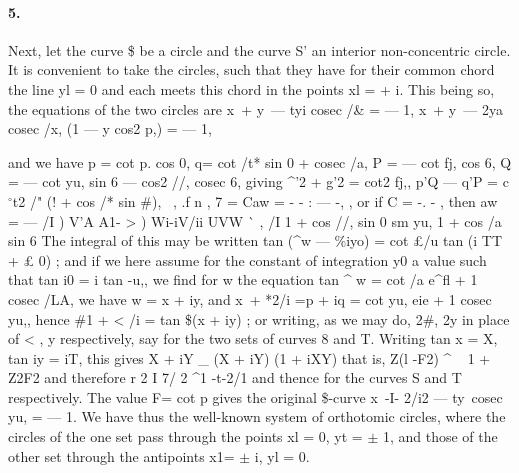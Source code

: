 \documentclass[11pt,a4paper]{book}
\begin{document}
{{{{{{\paragraph{5.} Next,  let  the  curve  \$  be  a  circle  and  the  curve  S'  an  interior  non-concentric
circle.  It  is  convenient  to  take  the  circles,  such  that  they  have  for  their  common
chord  the  line  yl  =  0  and  each  meets  this  chord  in  the  points  xl  =  +  i.
This  being  so,  the  equations  of  the  two  circles  are
x\  +  y\  ---  tyi  cosec  /\&  =  ---  1,
x\  +  y\  ---  2ya  cosec  /x,  (1  ---  y  cos2  p,)  =  ---  1,


and  we  have
p  =      cot  p.  cos  0,      q=     cot  /t*  sin  0  +  cosec  /a,
P  =  ---  cot  fj,  cos  6,     Q  =  ---  cot  yu,  sin  6  ---  cos2  //,  cosec  6,
giving
^'2  +  g'2  =  cot2  fj,,
p'Q  ---  q'P  =  c$^\circ$t2  /" (!  +  cos  /*  sin  \#),
~,  .f  n  ,
7  =  Caw  =  -  -  :  ---  -,  ,  or  if   C  =  -.  -  ,  then  aw  =
---     /I    )       V'A        A1-         >      )        Wi-iV/ii        UVW     ^^       ,     /I    
1  +  cos  //,  sin  0  sm  yu,  1  +  cos  /a  sin  6
The  integral  of  this  may  be  written
tan  (^w  ---  \%iyo)  =  cot  £/u  tan  (i  TT  +  £  0)  ;
and  if  we  here  assume  for  the  constant  of  integration  y0  a  value  such  that
tan    i0  =  i  tan  -u,,
we  find  for  w  the  equation
tan  ^  w  =  cot  /a  e^fl  +  1  cosec  /LA,
we  have  w  =  x  +  iy,  and
x\  +  *2/i  =p  +  iq  =  cot  yu,  eie  +  1  cosec  yu,,
hence
\#1  +  < /i  =  tan  \$(x  +  iy)  ;
or  writing,  as  we  may  do,  2\#,  2y  in  place  of  < ,  y  respectively,  say
for  the  two  sets  of  curves  8  and  T.
Writing  tan  x  =  X,  tan  iy  =  iT,  this  gives
X  +  iY  \_  (X  +  iY)  (1  +  iXY)
that  is,
Z(l  -F2)
^  ~  1  +  Z2F2
and  therefore
r  2    I    7/  2
^1     -t-2/1
and  thence
for  the  curves  S  and  T  respectively.     The  value  F=  cot  p  gives  the  original  \$-curve
x\  -I-  2/i2  ---  ty\  cosec  yu,  =  ---  1.
We  have  thus  the  well-known  system  of  orthotomic  circles,  where  the  circles  of  the
one  set  pass  through  the  points  xl  =  0,  yt  =  $\pm$  1,  and  those  of  the  other  set  through
the  antipoints  x1=  $\pm$  i,  yl  =  0.


}}}}}}
\end{document}
